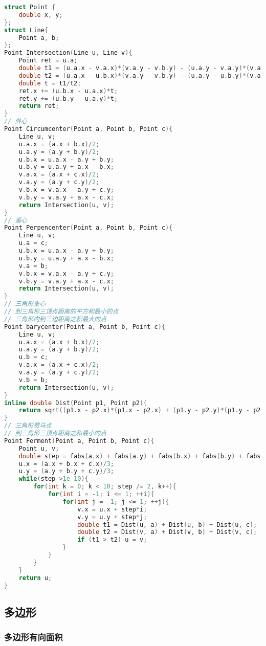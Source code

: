 \begin{lstlisting}[language=C++]
struct Point {
    double x, y;
};
struct Line{
    Point a, b;
};
Point Intersection(Line u, Line v){
    Point ret = u.a;
    double t1 = (u.a.x - v.a.x)*(v.a.y - v.b.y) - (u.a.y - v.a.y)*(v.a.x - v.b.x);
    double t2 = (u.a.x - u.b.x)*(v.a.y - v.b.y) - (u.a.y - u.b.y)*(v.a.x - v.b.x);
    double t = t1/t2;
    ret.x += (u.b.x - u.a.x)*t;
    ret.y += (u.b.y - u.a.y)*t;
    return ret;
}
// 外心
Point Circumcenter(Point a, Point b, Point c){
    Line u, v;
    u.a.x = (a.x + b.x)/2;
    u.a.y = (a.y + b.y)/2;
    u.b.x = u.a.x - a.y + b.y;
    u.b.y = u.a.y + a.x - b.x;
    v.a.x = (a.x + c.x)/2;
    v.a.y = (a.y + c.y)/2;
    v.b.x = v.a.x - a.y + c.y;
    v.b.y = v.a.y + a.x - c.x;
    return Intersection(u, v);
}
// 垂心
Point Perpencenter(Point a, Point b, Point c){
    Line u, v;
    u.a = c;
    u.b.x = u.a.x - a.y + b.y;
    u.b.y = u.a.y + a.x - b.x;
    v.a = b;
    v.b.x = v.a.x - a.y + c.y;
    v.b.y = v.a.y + a.x - c.x;
    return Intersection(u, v);
}
// 三角形重心
// 到三角形三顶点距离的平方和最小的点
// 三角形内到三边距离之积最大的点
Point barycenter(Point a, Point b, Point c){
    Line u, v;
    u.a.x = (a.x + b.x)/2;
    u.a.y = (a.y + b.y)/2;
    u.b = c;
    v.a.x = (a.x + c.x)/2;
    v.a.y = (a.y + c.y)/2;
    v.b = b;
    return Intersection(u, v);
}
inline double Dist(Point p1, Point p2){
    return sqrt((p1.x - p2.x)*(p1.x - p2.x) + (p1.y - p2.y)*(p1.y - p2.y));
}
// 三角形费马点
// 到三角形三顶点距离之和最小的点
Point Ferment(Point a, Point b, Point c){
    Point u, v;
    double step = fabs(a.x) + fabs(a.y) + fabs(b.x) + fabs(b.y) + fabs(c.x) + fabs(c.y);
    u.x = (a.x + b.x + c.x)/3;
    u.y = (a.y + b.y + c.y)/3;
    while(step >1e-10){
        for(int k = 0; k < 10; step /= 2, k++){
            for(int i = -1; i <= 1; ++i){
                for(int j = -1; j <= 1; ++j){
                    v.x = u.x + step*i;
                    v.y = u.y + step*j;
                    double t1 = Dist(u, a) + Dist(u, b) + Dist(u, c);
                    double t2 = Dist(v, a) + Dist(v, b) + Dist(v, c);
                    if (t1 > t2) u = v;
                }
            }
        }
    }
    return u;
}
\end{lstlisting}

\subsection{多边形}

\subsubsection{多边形有向面积}

